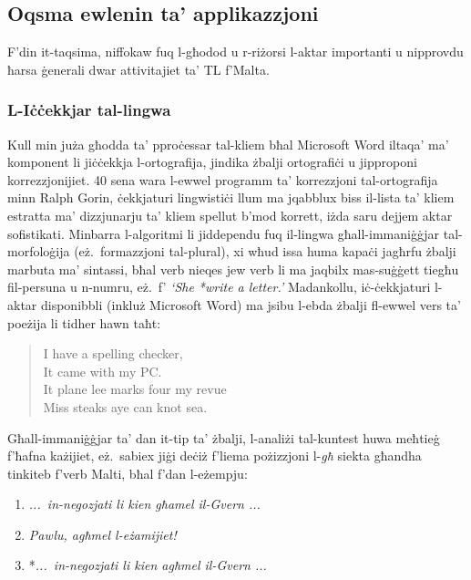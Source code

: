 \begin{multicols}{2}
\subsection{Oqsma ewlenin ta’ applikazzjoni} 

F'din it-taqsima, niffokaw fuq l-għodod u r-riżorsi l-aktar importanti u nipprovdu ħarsa ġenerali dwar attivitajiet ta' TL f'Malta.

\subsubsection{L-Iċċekkjar tal-lingwa}

Kull min juża għodda ta’ pproċessar tal-kliem bħal Microsoft Word iltaqa’ ma’ komponent li jiċċekkja l-ortografija, jindika żbalji ortografiċi u jipproponi korrezzjonijiet. 40 sena wara l-ewwel programm ta’ korrezzjoni tal-ortografija minn Ralph Gorin, ċekkjaturi lingwistiċi llum ma jqabblux biss il-lista ta’ kliem estratta ma’ dizzjunarju ta’ kliem spellut b’mod korrett, iżda saru dejjem aktar sofistikati. Minbarra l-algoritmi li jiddependu fuq il-lingwa għall-immaniġġjar tal-morfoloġija (eż.~formazzjoni tal-plural), xi wħud issa huma kapaċi jagħrfu żbalji marbuta ma’ sintassi, bħal verb nieqes jew verb li ma jaqbilx mas-suġġett tiegħu fil-persuna u n-numru, eż.~f’ \emph{`She *write a letter.’} Madankollu, iċ-ċekkjaturi l-aktar disponibbli (inkluż Microsoft Word) ma jsibu l-ebda żbalji fl-ewwel vers ta’ poeżija \cite{zar1} li tidher hawn taħt:

\begin{quote}
  I have a spelling checker,\\
  It came with my PC.\\
  It plane lee marks four my revue\\
  Miss steaks aye can knot sea.
\end{quote}

Għall-immaniġġjar ta’ dan it-tip ta’ żbalji, l-analiżi tal-kuntest huwa meħtieġ f'ħafna każijiet, eż.~sabiex jiġi deċiż f'liema pożizzjoni l-\emph{għ} siekta għandha tinkiteb f’verb Malti, bħal f’dan l-eżempju:

\begin{enumerate} %
\item \textit{...~in-negozjati li kien għamel il-Gvern ...}
\item \textit{Pawlu, agħmel l-eżamijiet!}
\item *\textit{...~in-negozjati li kien agħmel il-Gvern ...}
\end{enumerate}


\end{multicols}
